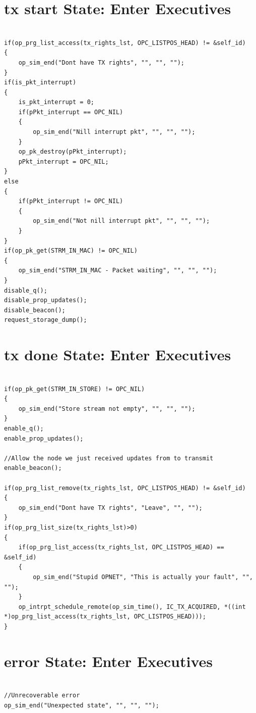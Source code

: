 \section{tx start State: Enter Executives}
{\tiny
\begin{verbatim}

if(op_prg_list_access(tx_rights_lst, OPC_LISTPOS_HEAD) != &self_id)
{
	op_sim_end("Dont have TX rights", "", "", "");	
}
if(is_pkt_interrupt)
{
	is_pkt_interrupt = 0;
	if(pPkt_interrupt == OPC_NIL)
	{
		op_sim_end("Nill interrupt pkt", "", "", "");	
	}
	op_pk_destroy(pPkt_interrupt);
	pPkt_interrupt = OPC_NIL;
}
else
{
	if(pPkt_interrupt != OPC_NIL)
	{
		op_sim_end("Not nill interrupt pkt", "", "", "");	
	}
}
if(op_pk_get(STRM_IN_MAC) != OPC_NIL)
{
	op_sim_end("STRM_IN_MAC - Packet waiting", "", "", "");	
}
disable_q();
disable_prop_updates();
disable_beacon();
request_storage_dump();

\end{verbatim}
}

\section{tx done State: Enter Executives}
{\tiny
\begin{verbatim}

if(op_pk_get(STRM_IN_STORE) != OPC_NIL)
{
	op_sim_end("Store stream not empty", "", "", "");
}
enable_q();
enable_prop_updates();

//Allow the node we just received updates from to transmit
enable_beacon();

if(op_prg_list_remove(tx_rights_lst, OPC_LISTPOS_HEAD) != &self_id)
{
	op_sim_end("Dont have TX rights", "Leave", "", "");	
}
if(op_prg_list_size(tx_rights_lst)>0)
{
	if(op_prg_list_access(tx_rights_lst, OPC_LISTPOS_HEAD) == &self_id)
	{
		op_sim_end("Stupid OPNET", "This is actually your fault", "", "");	
	}
	op_intrpt_schedule_remote(op_sim_time(), IC_TX_ACQUIRED, *((int *)op_prg_list_access(tx_rights_lst, OPC_LISTPOS_HEAD)));
}

\end{verbatim}
}

\section{error State: Enter Executives}
{\tiny
\begin{verbatim}

//Unrecoverable error
op_sim_end("Unexpected state", "", "", "");

\end{verbatim}
}

